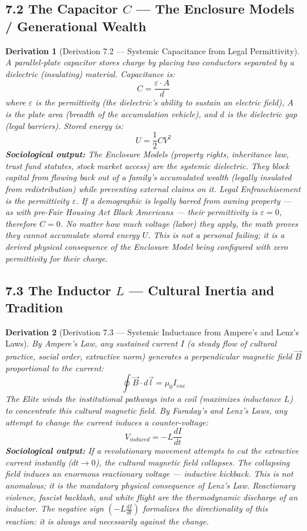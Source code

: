 \documentclass[12pt]{book}
\numberwithin{equation}{chapter}
\newtheorem{derivation}{Derivation}[chapter]
\begin{document}
\subsection{7.2 The Capacitor $C$ — The Enclosure Models / Generational Wealth}

\begin{derivation}[Derivation 7.2 — Systemic Capacitance from Legal Permittivity]
A parallel-plate capacitor stores charge by placing two conductors separated by a dielectric (insulating) material. Capacitance is:
      \[ C = \frac{\varepsilon \cdot A}{d} \]
    where $\varepsilon$ is the permittivity (the dielectric's ability to sustain an electric field), $A$ is the plate area (breadth of the accumulation vehicle), and $d$ is the dielectric gap (legal barriers). Stored energy is:
    \[
      U = \frac{1}{2}CV^2
    \]
    \textbf{Sociological output:} The Enclosure Models (property rights, inheritance law, trust fund statutes, stock market access) are the systemic dielectric. They block capital from flowing back out of a family's accumulated wealth (legally insulated from redistribution) while preventing external claims on it. Legal Enfranchisement is the permittivity $\varepsilon$. If a demographic is legally barred from owning property — as with pre-Fair Housing Act Black Americans — their permittivity is $\varepsilon = 0$, therefore $C = 0$. No matter how much voltage (labor) they apply, the math proves they cannot accumulate stored energy $U$. This is not a personal failing; it is a derived physical consequence of the Enclosure Model being configured with zero permittivity for their charge.
  \end{derivation}

\subsection{7.3 The Inductor $L$ — Cultural Inertia and Tradition}

\begin{derivation}[Derivation 7.3 — Systemic Inductance from Ampere's and Lenz's Laws]
By Ampere's Law, any sustained current $I$ (a steady flow of cultural practice, social order, extractive norm) generates a perpendicular magnetic field $\vec{B}$ proportional to the current:
      \[ \oint \vec{B} \cdot d\vec{l} = \mu_0 I_{enc} \]
    The Elite winds the institutional pathways into a coil (maximizes inductance $L$) to concentrate this cultural magnetic field. By Faraday's and Lenz's Laws, any attempt to change the current induces a counter-voltage:
    \[
      V_{induced} = -L \frac{dI}{dt}
    \]
    \textbf{Sociological output:} If a revolutionary movement attempts to cut the extractive current instantly ($dt \to 0$), the cultural magnetic field collapses. The collapsing field induces an enormous reactionary voltage — \emph{inductive kickback}. This is not anomalous; it is the mandatory physical consequence of Lenz's Law. Reactionary violence, fascist backlash, and white flight are the thermodynamic discharge of an inductor. The negative sign $(-L \frac{dI}{dt})$ formalizes the directionality of this reaction: it is always and necessarily against the change.
  \end{derivation}
\end{document}
